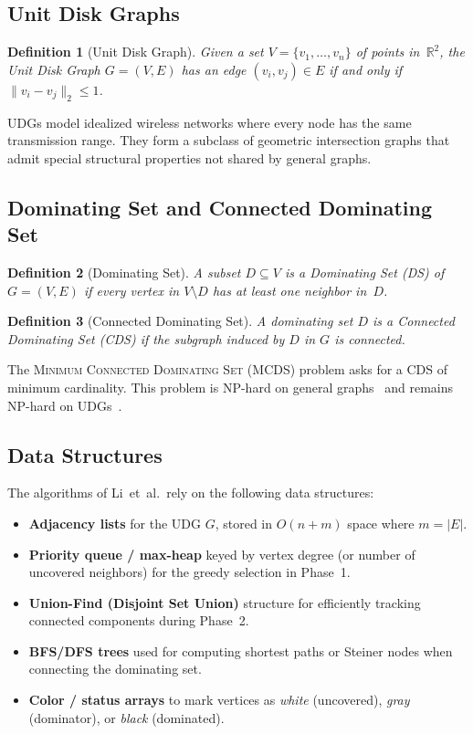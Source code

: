 \documentclass[11pt,a4paper]{article}
\newtheorem{definition}{Definition}
\begin{document}
\subsection{Unit Disk Graphs}

\begin{definition}[Unit Disk Graph]
Given a set $V = \{v_1, \ldots, v_n\}$ of points in~$\mathbb{R}^2$, the
\emph{Unit Disk Graph} $G = (V, E)$ has an edge $(v_i, v_j) \in E$ if and only
if $\|v_i - v_j\|_2 \leq 1$.
\end{definition}

UDGs model idealized wireless networks where every node has the same transmission
range.  They form a subclass of geometric intersection graphs that admit special
structural properties not shared by general graphs.

\subsection{Dominating Set and Connected Dominating Set}

\begin{definition}[Dominating Set]
A subset $D \subseteq V$ is a \emph{Dominating Set} (DS) of $G = (V, E)$ if
every vertex in $V \setminus D$ has at least one neighbor in~$D$.
\end{definition}

\begin{definition}[Connected Dominating Set]
A dominating set $D$ is a \emph{Connected Dominating Set} (CDS) if the subgraph
induced by $D$ in $G$ is connected.
\end{definition}

The \textsc{Minimum Connected Dominating Set} (MCDS) problem asks for a CDS of
minimum cardinality.  This problem is NP-hard on general
graphs~\cite{garey1979} and remains NP-hard on UDGs~\cite{clark1990}.

\subsection{Data Structures}

The algorithms of Li~et~al.\ rely on the following data structures:

\begin{itemize}[nosep]
  \item \textbf{Adjacency lists} for the UDG $G$, stored in $O(n + m)$ space
        where $m = |E|$.
  \item \textbf{Priority queue / max-heap} keyed by vertex degree (or number
        of uncovered neighbors) for the greedy selection in Phase~1.
  \item \textbf{Union-Find (Disjoint Set Union)} structure for efficiently
        tracking connected components during Phase~2.
  \item \textbf{BFS/DFS trees} used for computing shortest paths or Steiner
        nodes when connecting the dominating set.
  \item \textbf{Color / status arrays} to mark vertices as \emph{white}
        (uncovered), \emph{gray} (dominator), or \emph{black} (dominated).
\end{itemize}
\end{document}
